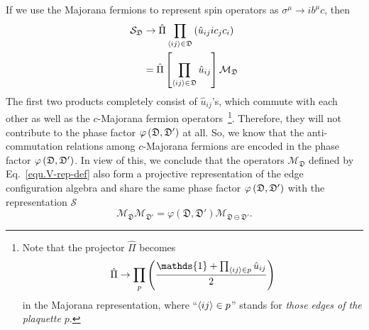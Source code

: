 If we use the Majorana fermions to represent spin operators as $\sigma^\mu\to ib^\mu c$, then 
\begin{align*}
    \mathcal{S}_\mathfrak{D} &\to \hat{\Pi} \prod_{\left\langle ij \right\rangle\in \mathfrak{D}}\left( \hat{u}_{ij}ic_jc_i \right) \\
    &= \hat{\Pi} \left[ \prod_{\left\langle ij \right\rangle\in \mathfrak{D}}\hat{u}_{ij} \right] \mathcal{M}_{\mathfrak{D}}
\end{align*}
The first two products completely consist of $\hat{u}_{ij}$'s, which commute with each other as well as the $c$-Majorana fermion operators~\footnote{Note that the projector $\hat{\Pi}$ becomes
\[\hat{\Pi} \to \prod_{ p}\lr{\frac{\mathds{1} + \prod_{\anglelr{ij}\in p}\hat{u}_{ij}}{2}}\]
in the Majorana representation, where ``$\left\langle ij \right\rangle\in p$'' stands for \textit{those edges of the plaquette $p$}.}. Therefore, they will not contribute to the phase factor $\varphi\left( \mathfrak{D},\mathfrak{D}' \right)$ at all. So, we know that the anti-commutation relations among $c$-Majorana fermions are encoded in the phase factor $\varphi\left( \mathfrak{D},\mathfrak{D}' \right)$. In view of this, we conclude that the operators $\mathcal{M}_\mathfrak{D}$ defined by Eq.~\eqref{equ.V-rep-def} also form a projective representation of the edge configuration algebra and share the same phase factor $\varphi\left( \mathfrak{D},\mathfrak{D}' \right)$ with the representation $\mathcal{S}$
\begin{equation}\label{equ.V-rep-algebra}
    \mathcal{M}_{\mathfrak{D}}\mathcal{M}_{\mathfrak{D}'} = \varphi(\mathfrak{D},\mathfrak{D}')\mathcal{M}_{\mathfrak{D}\ominus\mathfrak{D}'}.
\end{equation}

